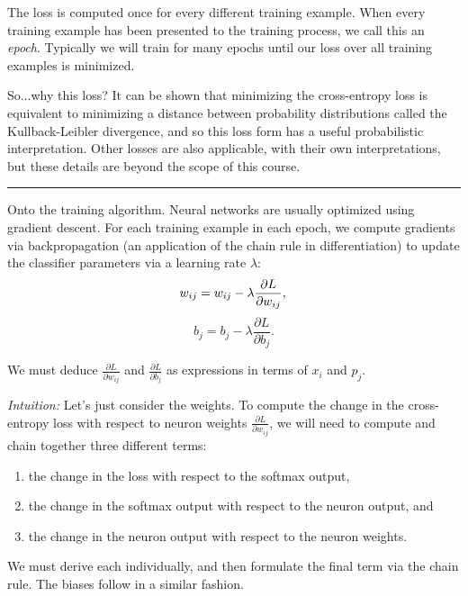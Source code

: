 The loss is computed once for every different training example. When every training example has been presented to the training process, we call this an \emph{epoch}. Typically we will train for many epochs until our loss over all training examples is minimized.

So...why this loss? It can be shown that minimizing the cross-entropy loss is equivalent to minimizing a distance between probability distributions called the Kullback-Leibler divergence, and so this loss form has a useful probabilistic interpretation. Other losses are also applicable, with their own interpretations, but these details are beyond the scope of this course.

\hspace{\fill}\rule{0.5\linewidth}{.5pt}\hspace{\fill}

Onto the training algorithm. Neural networks are usually optimized using gradient descent. For each training example in each epoch, we compute gradients via backpropagation (an application of the chain rule in differentiation) to update the classifier parameters via a learning rate $\lambda$:
\begin{equation}
w_{ij} = w_{ij} - \lambda\frac{\partial L}{\partial w_{ij}}, \\
\end{equation}
\begin{equation}
b_j = b_j - \lambda\frac{\partial L}{\partial b_j}.
\end{equation}

We must deduce $\frac{\partial L}{\partial w_{ij}}$ and $\frac{\partial L}{\partial b_j}$ as expressions in terms of $x_i$ and $p_j$.

\emph{Intuition:} Let's just consider the weights. To compute the change in the cross-entropy loss with respect to neuron weights $\frac{\partial L}{\partial w_{ij}}$, we will need to compute and chain together three different terms:
\begin{enumerate}
\itemsep0em 
\listparindent0em
\topsep0em
\parsep0em
\partopsep0em
\item the change in the loss with respect to the softmax output, 
\item the change in the softmax output with respect to the neuron output, and
\item the change in the neuron output with respect to the neuron weights.
\end{enumerate}
We must derive each individually, and then formulate the final term via the chain rule. The biases follow in a similar fashion.

